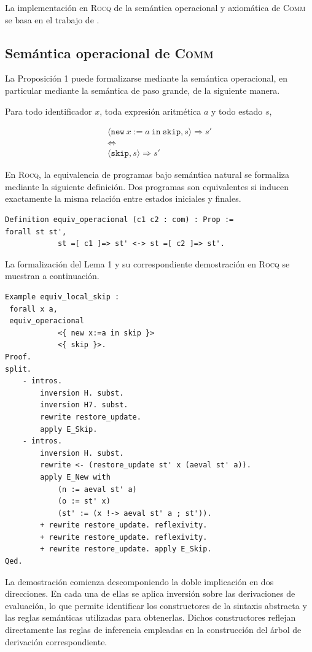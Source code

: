 La implementación en \textsc{Rocq} de la semántica operacional y axiomática de \textsc{Comm}  se basa en el trabajo de \cite{Pierce:SF2}.


\subsection{Semántica operacional de \textsc{Comm}}
La Proposición 1 puede formalizarse mediante la semántica operacional, en particular mediante la semántica de paso grande, de la siguiente manera.

\begin{lema}
Para todo identificador $x$, toda expresión aritmética $a$ y todo estado $s$,

\[
\begin{gathered}
\langle \mathtt{new }\ x := a\ \mathtt{in}\ \mathtt{skip}, s \rangle \Rightarrow s'
\\
\Longleftrightarrow 
\\
\langle \mathtt{skip}, s \rangle \Rightarrow s'
\end{gathered}
\]
\end{lema}


En \textsc{Rocq}, la equivalencia de programas bajo semántica natural se formaliza mediante la siguiente definición. Dos programas son equivalentes si inducen exactamente la misma relación entre estados iniciales y finales.

\begin{lstlisting}[caption={Definición de equivalencia operacional en Rocq}, basicstyle=\footnotesize \rmfamily
]
Definition equiv_operacional (c1 c2 : com) : Prop := 
forall st st', 
            st =[ c1 ]=> st' <-> st =[ c2 ]=> st'.
\end{lstlisting}

La formalización del Lema 1 y su correspondiente demostración en \textsc{Rocq} se muestran a continuación.

\begin{lstlisting}[caption={Programas equivalentes con semántica natural en Rocq}, basicstyle=\footnotesize \rmfamily
]
Example equiv_local_skip :
 forall x a,
 equiv_operacional
            <{ new x:=a in skip }>
            <{ skip }>.
Proof.
split.
    - intros.
        inversion H. subst.
        inversion H7. subst.
        rewrite restore_update.
        apply E_Skip.
    - intros.
        inversion H. subst. 
        rewrite <- (restore_update st' x (aeval st' a)).
        apply E_New with
            (n := aeval st' a)
            (o := st' x)
            (st' := (x !-> aeval st' a ; st')).
        + rewrite restore_update. reflexivity.
        + rewrite restore_update. reflexivity.
        + rewrite restore_update. apply E_Skip.
Qed.
\end{lstlisting}
La demostración comienza descomponiendo la doble implicación en dos direcciones. En cada una de ellas se aplica inversión sobre las derivaciones de evaluación, lo que permite identificar los constructores de la sintaxis abstracta y las reglas semánticas utilizadas para obtenerlas. Dichos constructores reflejan directamente las reglas de inferencia empleadas en la construcción del árbol de derivación correspondiente.

